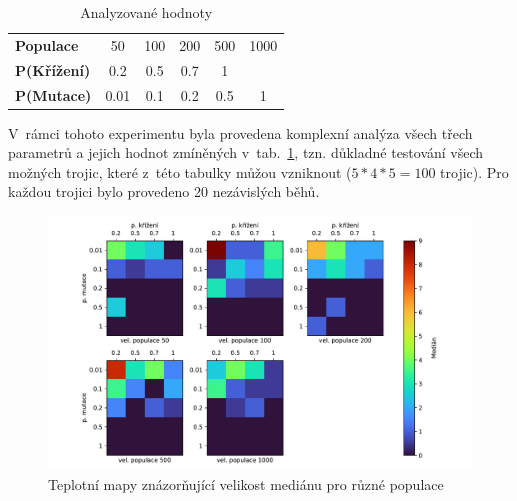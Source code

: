 \begin{table}[h!]
\centering
\begin{tabular}{lccccc}
\hline
\textbf{Populace}   & 50   & 100 & 200 & 500 & 1000 \\
\textbf{P(Křížení)} & 0.2  & 0.5 & 0.7 & 1   &      \\
\textbf{P(Mutace)}  & 0.01 & 0.1 & 0.2 & 0.5 & 1    \\ \hline
\end{tabular}
\caption{Analyzované hodnoty}
\label{tab:tgp-complex-params}
\end{table}

V~rámci tohoto experimentu byla provedena komplexní analýza všech třech parametrů a jejich hodnot zmíněných v~tab.~\ref{tab:tgp-complex-params}, tzn. důkladné testování všech možných trojic, které z~této tabulky můžou vzniknout ($5 * 4 * 5 = 100$ trojic). Pro každou trojici bylo provedeno 20 nezávislých běhů.

\begin{figure}[!h]
    \centering
    \includegraphics[scale=0.6]{obrazky-figures/tgp-20x20-heatmap.pdf}
    \caption{Teplotní mapy znázorňující velikost mediánu pro různé populace}
    \label{fig:gp-20x20-heatmap}
\end{figure} 


